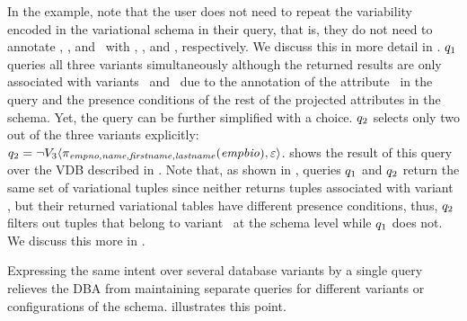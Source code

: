 

In the example, note that the user does not need to repeat the variability  encoded
in the variational schema in their query, that is, they do not need to annotate \name,
\fname, and \lname\ with \vFour, \vFive, and \vFive, respectively. We discuss
this in more detail in . $\vQ_1$
queries all three variants simultaneously although the returned results are
only associated with variants \vFour\ and \vFive\ due to the annotation of the
attribute \empno\ in the query and the presence conditions of the rest of the
projected attributes in the schema.
%
Yet, the query can be further simplified with a choice. $\vQ_2$ selects only two
out of the three variants explicitly:
$\vQ_2=\chc[\neg \vThree]{\pi_{\empno,\name,\fname,\lname}(\empbio),\empRel}$. 
%
 shows the result of this query over the VDB described in .
%
Note that, as shown in , 
queries $\vQ_1$ and $\vQ_2$ return the same set of variational tuples since
neither returns tuples associated with variant \vThree, but their returned
variational tables have different presence conditions, thus, $\vQ_2$ filters out
tuples that belong to variant \vThree\ at the schema level while $\vQ_1$ does not. We discuss this
more in . 
%


 Expressing
the same intent over several database variants by a single query relieves the DBA from
maintaining separate queries for different variants or configurations of the
schema.
illustrates this point.

